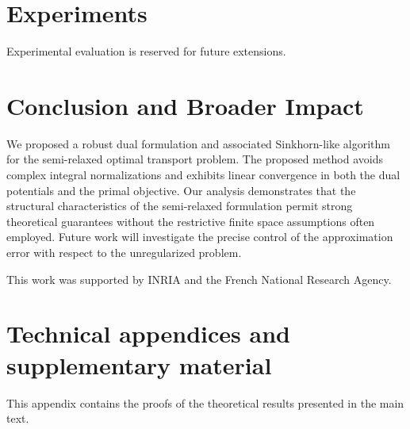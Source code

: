 \documentclass{article}
\begin{document}
\section{Experiments}
\label{sec:experiments}
Experimental evaluation is reserved for future extensions.

\section{Conclusion and Broader Impact}
\label{sec:conclusion}
We proposed a robust dual formulation and associated Sinkhorn-like algorithm for the semi-relaxed optimal transport problem. The proposed method avoids complex integral normalizations and exhibits linear convergence in both the dual potentials and the primal objective. Our analysis demonstrates that the structural characteristics of the semi-relaxed formulation permit strong theoretical guarantees without the restrictive finite space assumptions often employed. Future work will investigate the precise control of the approximation error with respect to the unregularized problem.

\begin{ack}
  This work was supported by INRIA and the French National Research Agency.
\end{ack}




\appendix
\section{Technical appendices and supplementary material}
\label{app:proofs}

This appendix contains the proofs of the theoretical results presented in the main text.
\end{document}
